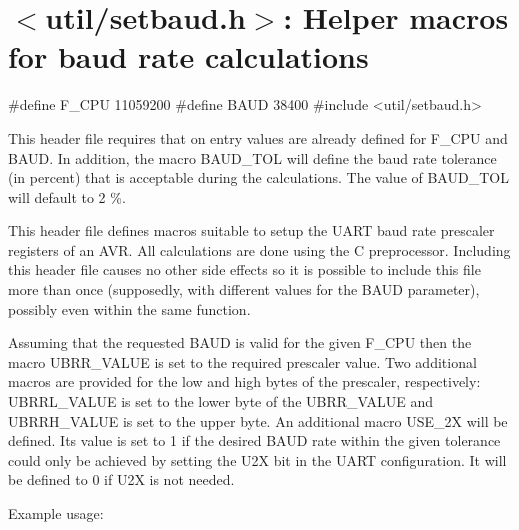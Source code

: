 \hypertarget{group__util__setbaud}{}\section{$<$util/setbaud.h$>$\+: Helper macros for baud rate calculations}
\label{group__util__setbaud}

\begin{DoxyCode}
\textcolor{preprocessor}{#define F\_CPU 11059200}
\textcolor{preprocessor}{#define BAUD 38400}
\textcolor{preprocessor}{#include <util/setbaud.h>}
\end{DoxyCode}


This header file requires that on entry values are already defined for F\+\_\+\+C\+PU and B\+A\+UD. In addition, the macro B\+A\+U\+D\+\_\+\+T\+OL will define the baud rate tolerance (in percent) that is acceptable during the calculations. The value of B\+A\+U\+D\+\_\+\+T\+OL will default to 2 \%.

This header file defines macros suitable to setup the U\+A\+RT baud rate prescaler registers of an A\+VR. All calculations are done using the C preprocessor. Including this header file causes no other side effects so it is possible to include this file more than once (supposedly, with different values for the B\+A\+UD parameter), possibly even within the same function.

Assuming that the requested B\+A\+UD is valid for the given F\+\_\+\+C\+PU then the macro U\+B\+R\+R\+\_\+\+V\+A\+L\+UE is set to the required prescaler value. Two additional macros are provided for the low and high bytes of the prescaler, respectively\+: U\+B\+R\+R\+L\+\_\+\+V\+A\+L\+UE is set to the lower byte of the U\+B\+R\+R\+\_\+\+V\+A\+L\+UE and U\+B\+R\+R\+H\+\_\+\+V\+A\+L\+UE is set to the upper byte. An additional macro U\+S\+E\+\_\+2X will be defined. Its value is set to 1 if the desired B\+A\+UD rate within the given tolerance could only be achieved by setting the U2X bit in the U\+A\+RT configuration. It will be defined to 0 if U2X is not needed.

Example usage\+:


